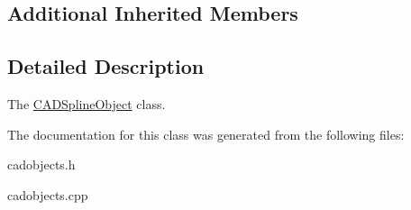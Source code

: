 \subsection*{Additional Inherited Members}


\subsection{Detailed Description}
The \hyperlink{class_c_a_d_spline_object}{C\+A\+D\+Spline\+Object} class. 

The documentation for this class was generated from the following files\+:\begin{DoxyCompactItemize}
\item 
cadobjects.\+h\item 
cadobjects.\+cpp\end{DoxyCompactItemize}
